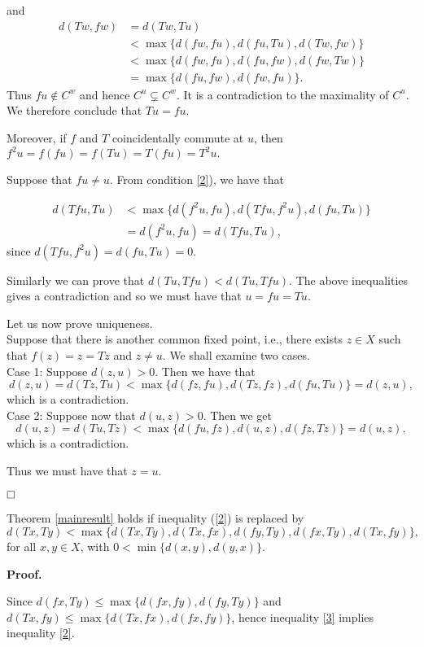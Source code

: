 \documentclass[10pt,a4paper]{article}
\begin{document}
{and 
\begin{align*}
  d(Tw,fw)&=d(Tw,Tu) \\
           & < \max\{ d(fw,fu),d(fu,Tu),d(Tw,fw)  \} \\
           & < \max \{d(fw,fu),d(fu,fw),d(fw,Tw) \} \\
           & = \max \{d(fu,fw),d(fw,fu)\}.
\end{align*}
Thus $fu \notin C^w$ and hence $C^u\subsetneq C^w$. It is a contradiction to the maximality of $C^u$. We therefore conclude that $Tu=fu.$
 
Moreover, if $f$ and $T$ coincidentally commute at $u$, then $f^2u=f(fu)=f(Tu)=T(fu)=T^2u.$
 
Suppose that $fu\neq u$. From condition \eqref{2}), we have that
 
 \begin{align*}
 d(Tfu,Tu) & < \max\{ d(f^2u ,fu), d(Tfu,f^2u),d(fu,Tu)\} \\
           & =  d(f^2u ,fu) = d(Tfu,Tu),
 \end{align*}
 since $d(Tfu,f^2u)=d(fu,Tu)=0$. 
 
Similarly we can prove that $d(Tu,Tfu)<d(Tu,Tfu)$. The above inequalities gives a contradiction and so we must have that $u=fu=Tu.$
 
Let us now prove uniqueness.\\
Suppose that there is another common fixed point, i.e., there exists $z\in X$ such that $f(z)=z=Tz$ and $z\neq u$. We shall examine two cases.\\

Case 1: Suppose $d(z,u)>0$. Then we have that 
\[d(z,u)=d(Tz,Tu)<\max\lbrace d(fz,fu),d(Tz,fz),d(fu,Tu)\rbrace=d(z,u),\]
which is a contradiction.\\

Case 2: Suppose now that $d(u,z)>0$. Then we get \[d(u,z)=d(Tu,Tz)<\max\lbrace d(fu,fz),d(u,z),d(fz,Tz)\rbrace=d(u,z),\]which is a contradiction. 

Thus we must have that $z=u$.

$\hfill{\Box}$

\corollary Theorem \ref{mainresult} holds if inequality (\ref{2}) is replaced by
\begin{equation}\label{3}
d(Tx,Ty)< \max\{ d(Tx,Ty),d(Tx,fx),d(fy,Ty),d(fx,Ty),d(Tx,fy)\},
\end{equation}
for all $x,y\in X$, with $0<\min\{d(x,y),d(y,x)\}$.

{\bf Proof.}

Since $d(fx,Ty) \leq \max\{  d(fx,fy),d(fy,Ty)\}$ and $d(Tx,fy) \leq \max\{  d(Tx,fx),d(fx,fy)\}$, hence inequality \eqref{3} implies inequality \eqref{2}.

}
\end{document}
